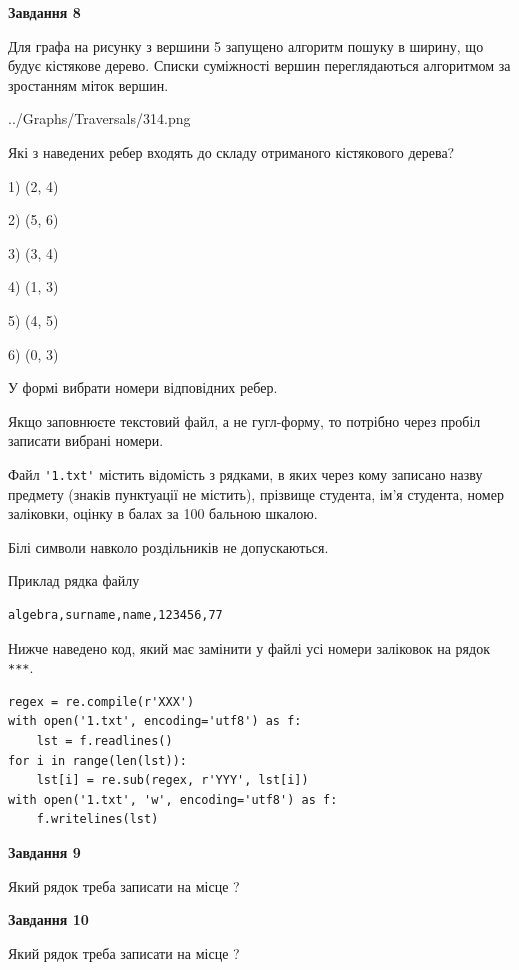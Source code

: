 \documentclass[12pt, ukrainian]{article}
\def\code#1{\Verb!#1!}
\begin{document}
{\begin {large}
{\begin {center}\textbf{Завдання 8}\end {center}}\par
Для графа на рисунку з вершини 5 запущено алгоритм пошуку в ширину, що будує кістякове дерево. Списки суміжності вершин переглядаються алгоритмом за зростанням міток вершин.\par
\begin{center}
	{../Graphs/Traversals/314.png}
\end{center}
\par Які з наведених ребер входять до складу отриманого кістякового дерева?\par
1) (2, 4)\par
2) (5, 6)\par
3) (3, 4)\par
4) (1, 3)\par
5) (4, 5)\par
6) (0, 3)\par
{\vskip 15pt} У формі вибрати номери відповідних ребер.


Якщо заповнюєте текстовий файл, а не гугл-форму, то потрібно через пробіл записа\-ти вибрані номери.\par
\newpage


Файл \code{'1.txt'} містить відомість з рядками, в яких через кому записа\-но назву предмету (знаків пунктуації не містить), прізвище студента, ім'я студента, номер залі\-ков\-ки, оцінку в балах за 100 бальною шкалою.

Білі символи навколо роздільників не допускаються.

Приклад рядка файлу



\begin{verbatim}
algebra,surname,name,123456,77
\end{verbatim}


Нижче наведено код, який має замінити у файлі усі номери заліковок на рядок \code{***}.



\begin{verbatim}
regex = re.compile(r'XXX')
with open('1.txt', encoding='utf8') as f:
    lst = f.readlines()
for i in range(len(lst)):
    lst[i] = re.sub(regex, r'YYY', lst[i])
with open('1.txt', 'w', encoding='utf8') as f:
    f.writelines(lst)
\end{verbatim}




{\begin {center}\textbf{Завдання 9}\end {center}}\par
Який рядок треба записати на місце  ?\par
\vspace{5mm}


{\begin {center}\textbf{Завдання 10}\end {center}}\par
Який рядок треба записати на місце  ?\par


\newpage


\end {large}}
\end{document}
